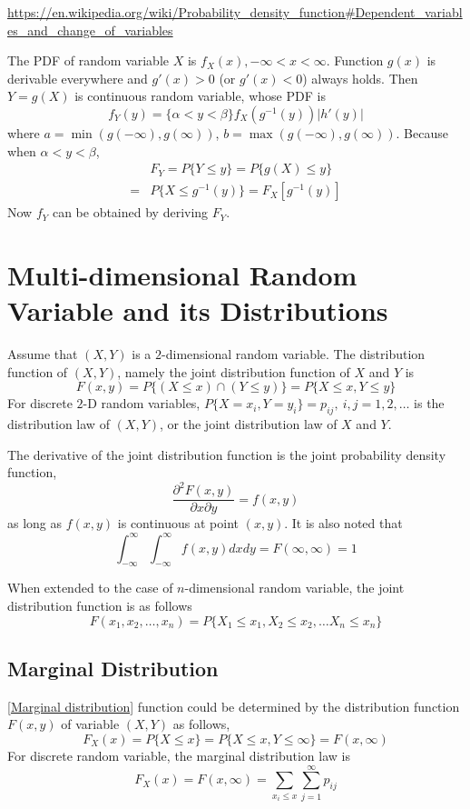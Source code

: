 \url{https://en.wikipedia.org/wiki/Probability_density_function#Dependent_variables_and_change_of_variables}

The PDF of random variable $X$ is $f_X(x), -\infty<x<\infty$. Function
$g(x)$ is derivable everywhere and $g'(x) >0$ (or $g'(x)<0$) always holds.
Then $Y = g(X)$ is continuous random variable, whose PDF is
$$ f_Y(y) = \{\alpha<y<\beta\} f_X(g^{-1}(y))|h'(y)| $$
where $a = \min(g(-\infty),g(\infty))$, $b= \max(g(-\infty),g(\infty))$.
Because when $\alpha < y < \beta$,
\begin{align}
	& F_Y = P\{Y\leq y\} = P\{g(X)\leq y\}\\
	=& P\{X\leq g^{-1}(y)\} = F_X[g^{-1}(y)]
\end{align}
Now $f_Y$ can be obtained by deriving $F_Y$.

\section{Multi-dimensional Random Variable and its Distributions}

Assume that $(X,Y)$ is a $2$-dimensional random variable. The distribution
function of $(X,Y)$, namely the joint distribution function of $X$ and $Y$ is
$$F(x,y) = P\{(X\leq x)\cap (Y\leq y)\} = P\{X\leq x, Y\leq y\}$$
For discrete $2$-D random variables, $P\{X=x_i,Y=y_i\}=p_{ij},~i,j=1,2,\ldots$
is the distribution law of $(X,Y)$, or the joint distribution law of $X$
and $Y$.

The derivative of the joint distribution function is the joint probability
density function,
$$ \frac{\partial^2 F(x,y)}{\partial x\partial y} = f(x,y) $$
as long as $f(x,y)$ is continuous at point $(x,y)$. It is also noted that
$$\int_{-\infty}^\infty \int_{-\infty}^\infty f(x,y)dxdy=F(\infty, \infty)=1$$

When extended to the case of $n$-dimensional random variable, the joint
distribution function is as follows
$$ F(x_1,x_2,\ldots,x_n) = P\{X_1\leq x_1, X_2\leq x_2, \ldots X_n\leq x_n\} $$

\subsection{Marginal Distribution}

[\href{https://en.wikipedia.org/wiki/Marginal_distribution}{Marginal distribution}]
function could be determined by the distribution function $F(x,y)$ of variable
$(X,Y)$ as follows,
$$ F_X(x) = P\{X\leq x\} = P\{X\leq x, Y\leq \infty\} = F(x,\infty)$$
For discrete random variable, the marginal distribution law is
$$ F_X(x) = F(x,\infty) = \sum_{x_i\leq x} \sum_{j=1}^\infty p_{ij}$$

